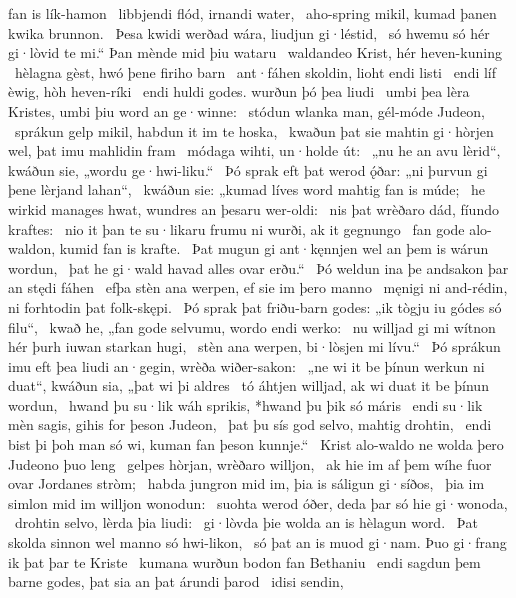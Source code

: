 fan is lík-hamon \hld\ libbjendi flód,
irnandi water, \hld\ aho-spring mikil,
kumad þanen kwika brunnon. \hld\ Þesa kwidi werðad wára,
liudjun gi·léstid, \hld\ só hwemu só hér gi·lòvid te mi.“
Þan mènde mid þiu wataru \hld\ waldandeo Krist,
hér heven-kuning \hld\ hèlagna gèst,
hwó þene firiho barn \hld\ ant·fáhen skoldin,
lioht endi listi \hld\ endi líf èwig,
hòh heven-ríki \hld\ endi huldi godes.
wurðun þó þea liudi \hld\ umbi þea lèra Kristes,
umbi þiu word an ge·winne: \hld\ stódun wlanka man,
gél-móde Judeon, \hld\ sprákun gelp mikil,
habdun it im te hoska, \hld\ kwaðun þat sie mahtin gi·hòrjen wel,
þat imu mahlidin fram \hld\ módaga wihti,
un·holde út: \hld\ „nu he an avu lèrid“, kwáðun sie,
„wordu ge·hwi-liku.“ \hld\ Þó sprak eft þat werod ǫ́ðar:
„ni þurvun gi þene lèrjand lahan“, \hld\ kwáðun sie: „kumad líves word
mahtig fan is múde; \hld\ he wirkid manages hwat,
wundres an þesaru wer-oldi: \hld\ nis þat wrèðaro dád,
fíundo kraftes: \hld\ nio it þan te su·likaru frumu ni wurði,
ak it gegnungo \hld\ fan gode alo-waldon,
kumid fan is krafte. \hld\ Þat mugun gi ant·kęnnjen wel
an þem is wárun wordun, \hld\ þat he gi·wald havad
alles ovar erðu.“ \hld\ Þó weldun ina þe andsakon þar
an stędi fáhen \hld\ efþa stèn ana werpen,
ef sie im þero manno \hld\ męnigi ni and-rédin,
ni forhtodin þat folk-skępi. \hld\ Þó sprak þat friðu-barn godes:
„ik tògju iu gódes só filu“, \hld\ kwað he, „fan gode selvumu,
wordo endi werko: \hld\ nu willjad gi mi wítnon hér
þurh iuwan starkan hugi, \hld\ stèn ana werpen,
bi·lòsjen mi lívu.“ \hld\ Þó sprákun imu eft þea liudi an·gegin,
wrèða wiðer-sakon: \hld\ „ne wi it be þínun werkun ni duat“, kwáðun sia,
„þat wi þi aldres \hld\ tó áhtjen willjad,
ak wi duat it be þínun wordun, \hld\ hwand þu su·lik wáh sprikis,
*hwand þu þik só máris \hld\ endi su·lik mèn sagis,
gihis for þeson Judeon, \hld\ þat þu sís god selvo,
mahtig drohtin, \hld\ endi bist þi þoh man só wi,
kuman fan þeson kunnje.“ \hld\ Krist alo-waldo
ne wolda þero Judeono þuo leng \hld\ gelpes hòrjan,
wrèðaro willjon, \hld\ ak hie im af þem wíhe fuor
ovar Jordanes stròm; \hld\ habda jungron mid im,
þia is sáligun gi·síðos, \hld\ þia im simlon mid im
willjon wonodun: \hld\ suohta werod óðer,
deda þar só hie gi·wonoda, \hld\ drohtin selvo,
lèrda þia liudi: \hld\ gi·lòvda þie wolda
an is hèlagun word. \hld\ Þat skolda sinnon wel
manno só hwi-likon, \hld\ só þat an is muod gi·nam.
Þuo gi·frang ik þat þar te Kriste \hld\ kumana wurðun %
bodon fan Bethaniu \hld\ endi sagdun þem barne godes,
þat sia an þat árundi þarod \hld\ idisi sendin,
